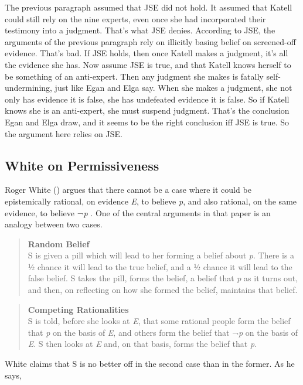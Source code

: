\documentclass[
  10pt,
  letterpaper,
  twoside]{scrbook}
\begin{document}
The previous paragraph assumed that JSE did not hold. It assumed that
{Katell} could still rely on the nine experts, even once she had
incorporated their testimony into a judgment. That's what JSE denies.
According to JSE, the arguments of the previous paragraph rely on
illicitly basing belief on screened-off evidence. That's bad. If JSE
holds, then once {Katell} makes a judgment, it's all the evidence she
has. Now assume JSE is true, and that {Katell} knows herself to be
something of an anti-expert. Then any judgment she makes is fatally
self-undermining, just like Egan and Elga say. When she makes a
judgment, she not only has evidence it is false, she has undefeated
evidence it is false. So if {Katell} knows she is an anti-expert, she
must suspend judgment. That's the conclusion Egan and Elga draw, and it
seems to be the right conclusion iff JSE is true. So the argument here
relies on JSE.

\subsection{White on Permissiveness}\label{whiteonpermissiveness}

Roger White () argues that there cannot be
a case where it could be epistemically rational, on evidence \emph{E},
to believe \emph{p}, and also rational, on the same evidence, to believe
¬\emph{p} . One of the central arguments in that paper is an analogy
between two cases.

\begin{quote}
\textbf{Random Belief}\\
S is given a pill which will lead to her forming a belief about
\emph{p}. There is a ½ chance it will lead to the true belief, and a ½
chance it will lead to the false belief. S takes the pill, forms the
belief, a belief that \emph{p} as it turns out, and then, on reflecting
on how she formed the belief, maintains that belief.
\end{quote}

\begin{quote}
\textbf{Competing Rationalities}\\
S is told, before she looks at \emph{E}, that some rational people form
the belief that \emph{p} on the basis of \emph{E}, and others form the
belief that ¬\emph{p} on the basis of \emph{E}. S then looks at \emph{E}
and, on that basis, forms the belief that \emph{p}.
\end{quote}

White claims that S is no better off in the second case than in the
former. As he says,
\end{document}

